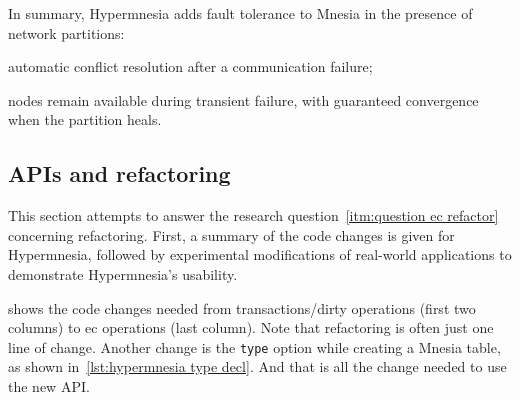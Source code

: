In summary, Hypermnesia adds fault tolerance to Mnesia in the presence of network partitions:
\begin{enumerate*}
  \item automatic conflict resolution after a communication failure;
  \item nodes remain available during transient failure, with guaranteed convergence
  when the partition heals. 
\end{enumerate*}

\subsection{APIs and refactoring} \label{sec:eval api}

This section attempts to answer the research question~\cref{itm:question ec refactor} 
concerning refactoring. First, a summary of the code changes is given for Hypermnesia, 
followed by experimental modifications of real-world applications to demonstrate 
Hypermnesia's usability.

 shows the code changes needed from transactions/dirty
operations (first two columns) to \acrshort{ec} operations (last column).
Note that refactoring is often just one line of change. Another change 
is the \texttt{type} option while creating
a Mnesia table, as shown in~\cref{lst:hypermnesia type decl}. And that is all
the change needed to use the new API\@. 


